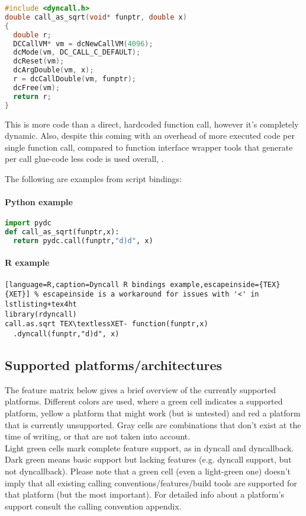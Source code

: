 \begin{lstlisting}[language=c,caption=Dyncall C library example]
#include <dyncall.h>
double call_as_sqrt(void* funptr, double x)
{
  double r;
  DCCallVM* vm = dcNewCallVM(4096);
  dcMode(vm, DC_CALL_C_DEFAULT);
  dcReset(vm);
  dcArgDouble(vm, x);  
  r = dcCallDouble(vm, funptr);
  dcFree(vm);
  return r;
}
\end{lstlisting}

This is more code than a direct, hardcoded function call, however it's completely dynamic.
Also, despite this coming with an overhead of more executed code per single function call,
compared to function interface wrapper tools that generate per call glue-code less code is
used overall, . %

The following are examples from script bindings:

\paragraph{Python example}

\begin{lstlisting}[language=python,caption=Dyncall Python bindings example]
import pydc
def call_as_sqrt(funptr,x):
  return pydc.call(funptr,"d)d", x)
\end{lstlisting}


\paragraph{R example}

\begin{lstlisting}[language=R,caption=Dyncall R bindings example,escapeinside={TEX}{XET}] % escapeinside is a workaround for issues with '<' in lstlisting+tex4ht
library(rdyncall)
call.as.sqrt TEX\textlessXET- function(funptr,x)
  .dyncall(funptr,"d)d", x)
\end{lstlisting}


\pagebreak

\subsection{Supported platforms/architectures}

The feature matrix below gives a brief overview of the currently supported
platforms. Different colors are used, where a green cell indicates a supported
platform, yellow a platform that might work (but is untested) and red a platform
that is currently unsupported. Gray cells are combinations that don't exist
at the time of writing, or that are not taken into account.\\
Light green cells mark complete feature support, as in dyncall and dyncallback. Dark green means basic support but lacking features (e.g. dyncall support, but not dyncallback).
Please note that a green cell (even a light-green one) doesn't imply that all existing calling conventions/features/build tools are supported for that platform (but the most
important).
For detailed info about a platform's support consult the calling convention appendix.


